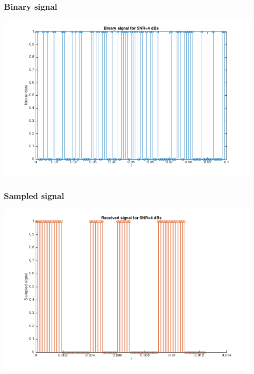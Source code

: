 \documentclass[11pt]{scrartcl}
\begin{document}
\subsubsection{Binary signal}
\begin{minipage}[t]{\linewidth}

{
\includegraphics[scale = 0.6]{Binary_signal.png}
}
\end{minipage}
\medskip
\subsubsection{Sampled signal}
\begin{minipage}[t]{\linewidth}
{
\includegraphics[scale = 0.6]{Sampled_signal.png}
}
\end{minipage}
\medskip
\end{document}
